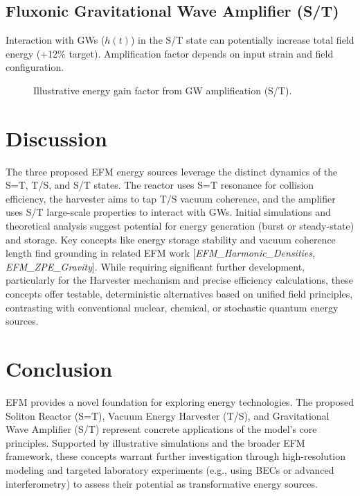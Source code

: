 \documentclass[11pt]{article}
\newcommand{\citep}[1]{[\textit{#1}]} %
\begin{document}
\subsection{Fluxonic Gravitational Wave Amplifier (S/T)}
Interaction with GWs (\(h(t)\)) in the S/T state can potentially increase total field energy (+12\% target). Amplification factor depends on input strain and field configuration.

\begin{figure}[htbp] %
    \centering
    \caption{Illustrative energy gain factor from GW amplification (S/T).}
    \label{fig:gw_amp}
\end{figure}

\section{Discussion}
The three proposed EFM energy sources leverage the distinct dynamics of the S=T, T/S, and S/T states. The reactor uses S=T resonance for collision efficiency, the harvester aims to tap T/S vacuum coherence, and the amplifier uses S/T large-scale properties to interact with GWs. Initial simulations and theoretical analysis suggest potential for energy generation (burst or steady-state) and storage. Key concepts like energy storage stability and vacuum coherence length find grounding in related EFM work \citep{EFM_Harmonic_Densities, EFM_ZPE_Gravity}. While requiring significant further development, particularly for the Harvester mechanism and precise efficiency calculations, these concepts offer testable, deterministic alternatives based on unified field principles, contrasting with conventional nuclear, chemical, or stochastic quantum energy sources.

\section{Conclusion}
EFM provides a novel foundation for exploring energy technologies. The proposed Soliton Reactor (S=T), Vacuum Energy Harvester (T/S), and Gravitational Wave Amplifier (S/T) represent concrete applications of the model's core principles. Supported by illustrative simulations and the broader EFM framework, these concepts warrant further investigation through high-resolution modeling and targeted laboratory experiments (e.g., using BECs or advanced interferometry) to assess their potential as transformative energy sources.
\end{document}
